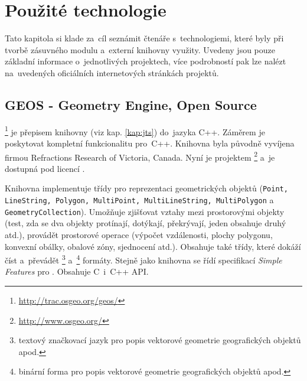 \chapter{Použité technologie}
\label{4-technologie}

Tato kapitola si klade za~cíl seznámit čtenáře s~technologiemi, které byly 
při tvorbě zásuvného modulu a~externí knihovny využity. Uvedeny jsou pouze
základní informace o~jednotlivých projektech, více podrobností pak lze
nalézt na~uvedených oficiálních internetových stránkách projektů.


\section{GEOS - Geometry Engine, Open Source}
\label{geos}

\footnote{\url{http://trac.osgeo.org/geos/}}  je přepisem 
knihovny  (viz kap. \ref{kap:jts}) do~jazyka C++. 
Záměrem je poskytovat kompletní funkcionalitu  pro~C++. Knihovna byla 
původně vyvíjena firmou Refractions Research of Victoria, Canada. Nyní je
projektem \footnote{\url{http://www.osgeo.org/}}  a~je 
dostupná pod licencí .

Knihovna  implementuje třídy pro reprezentaci geometrických
objektů (\texttt{Point, LineString, Polygon, MultiPoint, MultiLineString,
MultiPolygon} a \texttt{GeometryCollection}). Umožňuje zjišťovat vztahy 
mezi prostorovými objekty (test, zda se dva objekty protínají, dotýkají, 
překrývají, jeden obsahuje druhý atd.), provádět prostorové operace 
(výpočet vzdálenosti, plochy polygonu, konvexní obálky, obalové zóny, 
sjednocení atd.). Obsahuje také třídy, které dokáží číst a~převádět
\footnote{textový značkovací jazyk pro popis vektorové 
geometrie geografických objektů apod.} a~\footnote{binární
forma pro popis vektorové geometrie geografických objektů apod.} formáty. 
Stejně jako knihovna  se řídí specifikací \textit{Simple Features}
pro . Obsahuje C~i~C++ API.


% 


